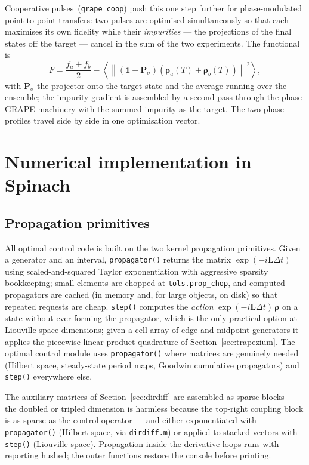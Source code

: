\documentclass[11pt,a4paper]{article}
\newcommand{\code}[1]{\texttt{#1}}
\begin{document}
Cooperative pulses~(\code{grape\_coop}) push this one step further for
phase-modulated point-to-point transfers: two pulses are optimised
simultaneously so that each maximises its own fidelity while their
\emph{impurities} --- the projections of the final states off the target
--- cancel in the sum of the two experiments. The functional is
\begin{equation}
  F=\frac{f_a+f_b}{2}
  -\left\langle\left\|
   (\mathbf{1}-\mathbf{P}_{\sigma})
   (\boldsymbol{\rho}_a(T)+\boldsymbol{\rho}_b(T))
   \right\|^2\right\rangle,
\end{equation}
with $\mathbf{P}_{\sigma}$ the projector onto the target state and the
average running over the ensemble; the impurity gradient is assembled by
a second pass through the phase-GRAPE machinery with the summed impurity
as the target. The two phase profiles travel side by side in one
optimisation vector.
\section{Numerical implementation in Spinach}

\subsection{Propagation primitives}

All optimal control code is built on the two kernel propagation
primitives. Given a generator and an interval, \code{propagator()}
returns the matrix $\exp(-i\mathbf{L}\Delta t)$ using
scaled-and-squared Taylor exponentiation with aggressive sparsity
bookkeeping; small elements are chopped at \code{tols.prop\_chop}, and
computed propagators are cached (in memory and, for large objects, on
disk) so that repeated requests are cheap. \code{step()} computes the
\emph{action} $\exp(-i\mathbf{L}\Delta t)\,\boldsymbol{\rho}$ on a
state without ever forming the propagator, which is the only practical
option at Liouville-space dimensions; given a cell array of edge and
midpoint generators it applies the piecewise-linear product quadrature
of Section~\ref{sec:trapezium}. The optimal control module uses
\code{propagator()} where matrices are genuinely needed (Hilbert space,
steady-state period maps, Goodwin cumulative propagators) and
\code{step()} everywhere else.

The auxiliary matrices of Section~\ref{sec:dirdiff} are assembled as
sparse blocks --- the doubled or tripled dimension is harmless because
the top-right coupling block is as sparse as the control operator ---
and either exponentiated with \code{propagator()} (Hilbert space, via
\code{dirdiff.m}) or applied to stacked vectors with \code{step()}
(Liouville space). Propagation inside the derivative loops runs with
reporting hushed; the outer functions restore the console before
printing.
\end{document}
